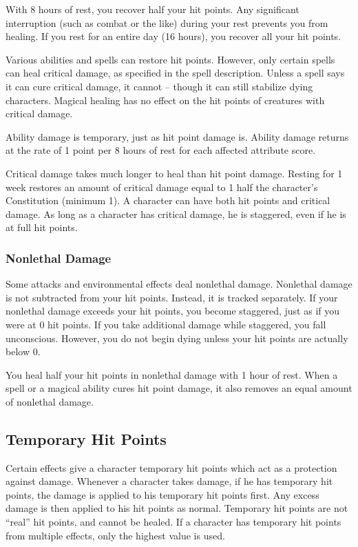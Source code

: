  With 8 hours of rest, you recover half your hit points. Any significant interruption (such as combat or the like) during your rest prevents you from healing. If you rest for an entire day (16 hours), you recover all your hit points.

 Various abilities and spells can restore hit points. However, only certain spells can heal critical damage, as specified in the spell description. Unless a spell says it can cure critical damage, it cannot -- though it can still stabilize dying characters. Magical healing has no effect on the hit points of creatures with critical damage.

 Ability damage is temporary, just as hit point damage is. Ability damage returns at the rate of 1 point per 8 hours of rest for each affected attribute score.

 Critical damage takes much longer to heal than hit point damage. Resting for 1 week restores an amount of critical damage equal to 1 \add half the character's Constitution (minimum 1). A character can have both hit points and critical damage. As long as a character has critical damage, he is staggered, even if he is at full hit points.

\subsubsection{Nonlethal Damage}\label{Nonlethal Damage}
Some attacks and environmental effects deal nonlethal damage. Nonlethal damage is not subtracted from your hit points. Instead, it is tracked separately. If your nonlethal damage exceeds your hit points, you become staggered, just as if you were at 0 hit points. If you take additional damage while staggered, you fall unconscious. However, you do not begin dying unless your hit points are actually below 0. 

You heal half your hit points in nonlethal damage with 1 hour of rest. When a spell or a magical ability cures hit point damage, it also removes an equal amount of nonlethal damage.

\subsection{Temporary Hit Points}\label{Temporary Hit Points}
Certain effects give a character temporary hit points which act as a protection against damage. Whenever a character takes damage, if he has temporary hit points, the damage is applied to his temporary hit points first. Any excess damage is then applied to his hit points as normal. Temporary hit points are not ``real'' hit points, and cannot be healed. If a character has temporary hit points from multiple effects, only the highest value is used.

